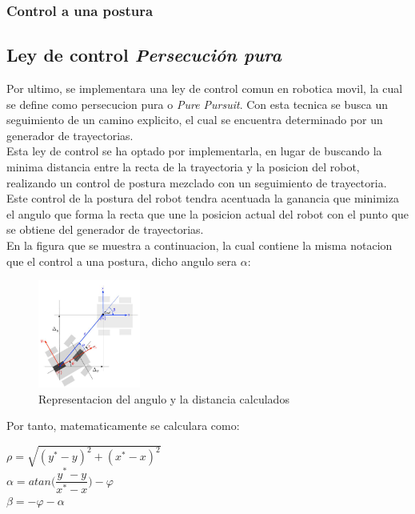 \documentclass[a4paper,twoside]{article}
\begin{document}
	
	\subsubsection{Control a una postura}

\newpage

\subsection{Ley de control \textit{Persecución pura}}
Por ultimo, se implementara una ley de control comun en robotica movil, la cual se define como persecucion pura o \textit{Pure Pursuit}. Con esta tecnica se busca un seguimiento de un camino explicito, el cual se encuentra determinado por un generador de trayectorias.\\
Esta ley de control se ha optado por implementarla, en lugar de buscando la minima distancia entre la recta de la trayectoria y la posicion del robot, realizando un control de postura mezclado con un seguimiento de trayectoria. \\
Este control de la postura del robot tendra acentuada la ganancia que minimiza el angulo que forma la recta que une la posicion actual del robot con el punto que se obtiene del generador de trayectorias.\\
En la figura que se muestra a continuacion, la cual contiene la misma notacion que el control a una postura, dicho angulo sera $\alpha$:

\begin{figure}[h!]
   \centering
   \includegraphics[width=0.3\textwidth]{postura}
   \caption{Representacion del angulo y la distancia calculados}
\end{figure}

Por tanto, matematicamente se calculara como:
\begin{center}
$\rho=\sqrt{(y^*-y)^2+(x^*-x)^2}$ \\
$\alpha=atan\Big(\dfrac{y^*-y}{x^*-x}\Big)-\varphi$ \\
$\beta=-\varphi-\alpha$
\end{center}
\end{document}
